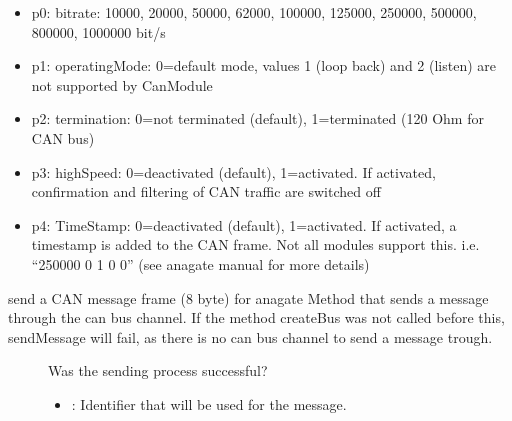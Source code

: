 \documentclass[letterpaper,10pt,english]{sphinxmanual}
\begin{document}
\begin{fulllineitems}
\begin{fulllineitems}
\begin{description}
\begin{itemize}
\begin{itemize}
\item {} 
p0: bitrate: 10000, 20000, 50000, 62000, 100000, 125000, 250000, 500000, 800000, 1000000 bit/s

\item {} 
p1: operatingMode: 0=default mode, values 1 (loop back) and 2 (listen) are not supported by CanModule

\item {} 
p2: termination: 0=not terminated (default), 1=terminated (120 Ohm for CAN bus)

\item {} 
p3: highSpeed: 0=deactivated (default), 1=activated. If activated, confirmation and filtering of CAN traffic are switched off

\item {} 
p4: TimeStamp: 0=deactivated (default), 1=activated. If activated, a timestamp is added to the CAN frame. Not all modules support this. i.e. “250000 0 1 0 0” (see anagate manual for more details)

\end{itemize}


\end{itemize}

\end{description}


\end{fulllineitems}


\begin{fulllineitems}
\label{\detokenize{vendors/anagate:_CPPv4N10AnaCanScan11sendMessageEshPhb}}%
\pysigstartmultiline
{}\label{\detokenize{vendors/anagate:classAnaCanScan_1ad45666454318c891d7acd9fe16ae4c49}}%
\pysigstopmultiline
send a CAN message frame (8 byte) for anagate Method that sends a message through the can bus channel. If the method createBus was not called before this, sendMessage will fail, as there is no can bus channel to send a message trough. \begin{description}
\item[{}] \leavevmode
Was the sending process successful? 

\item[{}] \leavevmode\begin{itemize}
\item {} 
: Identifier that will be used for the message. 


\end{itemize}
\end{description}
\end{fulllineitems}
\end{fulllineitems}
\end{document}
